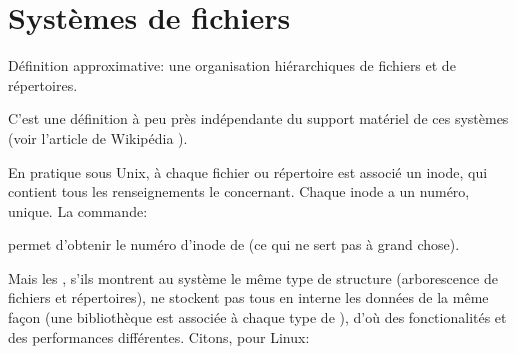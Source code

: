 \section{Systèmes de fichiers}
Définition approximative: une organisation hiérarchiques de fichiers
et de répertoires.

C'est une définition à peu près indépendante du support matériel de
ces systèmes (voir l'article de Wikipédia \cite{fs}).

En pratique sous Unix, à chaque fichier ou répertoire est associé un
\textsf{inode}, qui contient tous les renseignements le
concernant. Chaque inode a un numéro, unique. La commande:


permet d'obtenir le numéro d'inode de  (ce qui ne sert pas
  à grand chose).

  Mais les  \sffs, s'ils montrent au système le même type de
  structure (arborescence de fichiers et répertoires), ne stockent pas 
  tous en interne les données de la même façon (une bibliothèque est
  associée à chaque type de  \sff), d'où des fonctionalités et des
  performances différentes.
  Citons, pour Linux:

